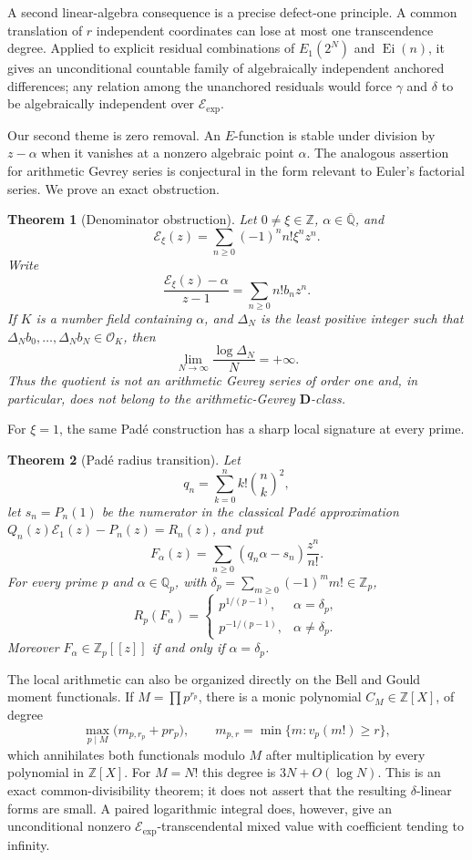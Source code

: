\documentclass[11pt]{article}
\newtheorem{theorem}{Theorem}[section]
\theoremstyle{definition}
\theoremstyle{remark}
\newcommand{\Q}{\mathbb Q}
\newcommand{\Qb}{\overline{\mathbb Q}}
\newcommand{\Z}{\mathbb Z}
\newcommand{\Ei}{\operatorname{Ei}}
\newcommand{\Eul}{\mathcal E}
\newcommand{\Eexp}{\mathcal E_{\mathrm{exp}}}
\newcommand{\OO}{\mathcal O}
\begin{document}
A second linear-algebra consequence is a precise defect-one principle.  A
common translation of \(r\) independent coordinates can lose at most one
transcendence degree.  Applied to explicit residual combinations of
\(E_1(2^N)\) and \(\Ei(n)\), it gives an unconditional countable family of
algebraically independent anchored differences; any relation among the
unanchored residuals would force \(\gamma\) and \(\delta\) to be
algebraically independent over \(\Eexp\).

Our second theme is zero removal.  An \(E\)-function is stable under division
by \(z-\alpha\) when it vanishes at a nonzero algebraic point \(\alpha\).
The analogous assertion for arithmetic Gevrey series is conjectural in the
form relevant to Euler's factorial series.  We prove an exact obstruction.

\begin{theorem}[Denominator obstruction]\label{thm:den-intro}
Let \(0\ne\xi\in\Z\), \(\alpha\in\Qb\), and
\[
 \Eul_\xi(z)=\sum_{n\ge0}(-1)^n n!\xi^n z^n.
\]
Write
\[
 \frac{\Eul_\xi(z)-\alpha}{z-1}=\sum_{n\ge0}n!b_nz^n.
\]
If \(K\) is a number field containing \(\alpha\), and \(\Delta_N\) is the
least positive integer such that
\(\Delta_Nb_0,\ldots,\Delta_Nb_N\in\OO_K\), then
\[
 \lim_{N\to\infty}\frac{\log\Delta_N}{N}=+\infty.
\]
Thus the quotient is not an arithmetic Gevrey series of order one and, in
particular, does not belong to the arithmetic-Gevrey \(\mathbf D\)-class.
\end{theorem}

For \(\xi=1\), the same Pad\'e construction has a sharp local signature at
every prime.

\begin{theorem}[Pad\'e radius transition]\label{thm:radius-intro}
Let
\[
 q_n=\sum_{k=0}^n k!\binom nk^2,
\]
let \(s_n=P_n(1)\) be the numerator in the classical Pad\'e approximation
\(Q_n(z)\Eul_1(z)-P_n(z)=R_n(z)\), and put
\[
 F_\alpha(z)=\sum_{n\ge0}(q_n\alpha-s_n)\frac{z^n}{n!}.
\]
For every prime \(p\) and \(\alpha\in\Q_p\), with
\(\delta_p=\sum_{m\ge0}(-1)^m m!\in\Z_p\),
\[
 R_p(F_\alpha)=
 \begin{cases}
 p^{1/(p-1)},&\alpha=\delta_p,\\
 p^{-1/(p-1)},&\alpha\ne\delta_p.
 \end{cases}
\]
Moreover \(F_\alpha\in\Z_p[[z]]\) if and only if \(\alpha=\delta_p\).
\end{theorem}

The local arithmetic can also be organized directly on the Bell and Gould
moment functionals.  If \(M=\prod p^{r_p}\), there is a monic polynomial
\(C_M\in\Z[X]\), of degree
\[
 \max_{p\mid M}\bigl(m_{p,r_p}+pr_p\bigr),
 \qquad m_{p,r}=\min\{m:v_p(m!)\geq r\},
\]
which annihilates both functionals modulo \(M\) after multiplication by
every polynomial in \(\Z[X]\).  For \(M=N!\) this degree is
\(3N+O(\log N)\).  This is an exact common-divisibility theorem; it does not
assert that the resulting \(\delta\)-linear forms are small.  A paired
logarithmic integral does, however, give an unconditional nonzero
\(\Eexp\)-transcendental mixed value with coefficient tending to infinity.
\end{document}
